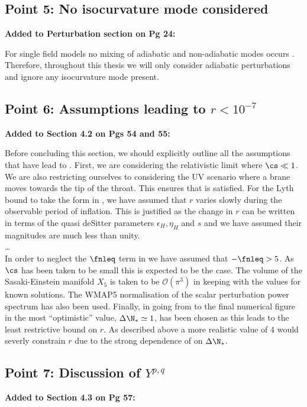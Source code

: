 \subsection{Point 5: No isocurvature mode considered}
\textbf{Added to Perturbation section on Pg 24:}

For single field models no mixing
of adiabatic and non-adiabatic modes occurs \cite{Weinberg200804}. Therefore, throughout this
thesis we will only consider adiabatic perturbations and ignore any isocurvature mode present.

\subsection{Point 6: Assumptions leading to \texorpdfstring{$r<10^{-7}$}{r<10**-7}}
\textbf{Added to Section 4.2 on Pgs 54 and 55:}


Before concluding this section, we should explicitly outline all the assumptions that have lead to
. First, we are considering the relativistic limit where $\cs\ll1$. We are
also restricting ourselves to considering the UV scenario where a brane moves towards the tip of
the throat. This ensures that  is satisfied. For the Lyth bound to take the
form in , we have assumed that $r$ varies slowly during the observable
period of inflation. This is justified as the change in $r$ can be written in terms of the
quasi deSitter parameters $\epsilon_H, \eta_H$ and $s$ and we have assumed their magnitudes are
much less than unity.
\\
\ldots
\\
In order to neglect the $\fnleq$ term in  we have assumed that $-\fnleq>5$. As
$\cs$ has been taken to be small this is expected to be the case. The volume of the Sasaki-Einstein
manifold $X_5$ is taken to be $\mathcal{O}(\pi^3)$ in keeping with the values for known solutions.
The WMAP5 normalisation of the scalar perturbation power spectrum has also been used. Finally, in
going from  to the final numerical figure in  the most
``optimistic'' value, $\Delta \N_*\simeq 1$, has been chosen as this leads to the least
restrictive bound on $r$.  As described above a more realistic value of $4$ would severly
constrain $r$ due to the strong dependence of  on $\Delta\N_*$.

\subsection{Point 7: Discussion of \texorpdfstring{$Y^{p,q}$}{Y**p,q}}
\textbf{Added to Section 4.3 on Pg 57:}

